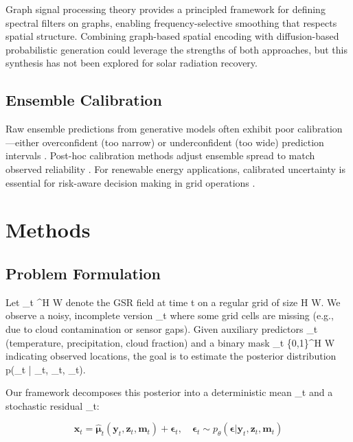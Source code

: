 \documentclass[preprint,12pt]{elsarticle}
\begin{document}
Graph signal processing theory \cite{shuman2013emerging, ortega2018graph} provides a principled framework for defining spectral filters on graphs, enabling frequency-selective smoothing that respects spatial structure. Combining graph-based spatial encoding with diffusion-based probabilistic generation could leverage the strengths of both approaches, but this synthesis has not been explored for solar radiation recovery.

\subsection{Ensemble Calibration}

Raw ensemble predictions from generative models often exhibit poor calibration---either overconfident (too narrow) or underconfident (too wide) prediction intervals \cite{gneiting2005calibrated}. Post-hoc calibration methods adjust ensemble spread to match observed reliability \cite{pinson2012adaptive, kleiber2021calibration}. For renewable energy applications, calibrated uncertainty is essential for risk-aware decision making in grid operations \cite{wan2014review}.

\section{Methods}
\label{sec:methods}

\subsection{Problem Formulation}

Let _t \in {}^{H \times W} denote the GSR field at time t on a regular grid of size H \times W. We observe a noisy, incomplete version _t where some grid cells are missing (e.g., due to cloud contamination or sensor gaps). Given auxiliary predictors _t (temperature, precipitation, cloud fraction) and a binary mask _t \in \{0,1\}^{H \times W} indicating observed locations, the goal is to estimate the posterior distribution p(_t | _t, _t, _t).

Our framework decomposes this posterior into a deterministic mean \hat{\boldsymbol{\mu}}_t and a stochastic residual \boldsymbol{\epsilon}_t:

\begin{equation}
\mathbf{x}_t = \hat{\boldsymbol{\mu}}_t(\mathbf{y}_t, \mathbf{z}_t, \mathbf{m}_t) + \boldsymbol{\epsilon}_t, \quad \boldsymbol{\epsilon}_t \sim p_{\theta}(\boldsymbol{\epsilon} | \mathbf{y}_t, \mathbf{z}_t, \mathbf{m}_t)
\label{eq:decomposition}
\end{equation}
\end{document}
